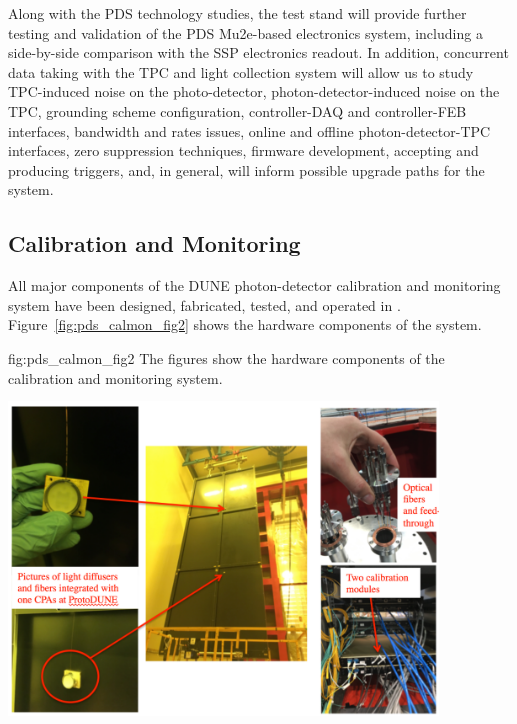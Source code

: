 Along with the PDS technology studies, the test stand will  provide further testing and validation of the PDS Mu2e-based electronics system, including a side-by-side comparison with the  SSP electronics readout. In addition, concurrent data taking with the TPC and light collection system will allow us to study TPC-induced noise on the photo-detector, photon-detector-induced noise on the TPC, grounding scheme configuration, controller-DAQ and controller-FEB interfaces, bandwidth and rates issues, online and offline photon-detector-TPC interfaces, zero suppression techniques, firmware development, accepting and producing triggers, and, in general, will inform possible upgrade paths for the system. 


\subsection{Calibration and Monitoring}
\label{sec:fdsp-pd-validation-candm}


All major components of the DUNE photon-detector calibration and monitoring system have been designed, fabricated, tested, and operated in .
Figure~\ref{fig:pds_calmon_fig2} shows the hardware components of the system.

 \begin{dunefigure}
 {fig:pds_calmon_fig2}
 {The figures show the hardware components of the  calibration and monitoring system.}
 \includegraphics[angle=0,width=11.4cm,height=9cm]{graphics/pds-calmon-fig2.png}
\end{dunefigure}

